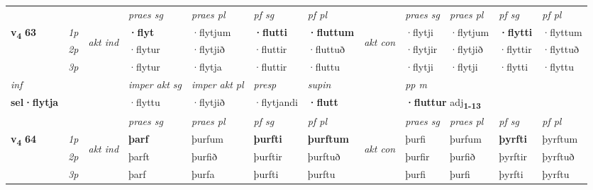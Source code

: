 \begin{longtable}[l]{X>{\footnotesize\itshape}llXXXXlXXXX}
 & &   & \textit{praes sg}  & \textit{praes pl}    & \textit{ pf sg} & \textit{pf pl} & & \textit{praes sg}  & \textit{praes pl}    & \textit{pf sg} & \textit{pf pl }  \\ \cmidrule{4-7} \cmidrule{9-12}
 \multirow{2}{*}{{{\textbf{v{\textsubscript{4}}} \Large{\textbf{63}}}}}  & 1p & \multirow{3}{*}{\begin{turn}{90}\textit{akt ind}\end{turn}} & \textbf{·flyt} & ·flytjum & \textbf{·flutti} & \textbf{·fluttum} & \multirow{3}{*}{\begin{turn}{90}\textit{akt con}\end{turn}} &·flytji & ·flytjum & \textbf{·flytti} & ·flyttum\\*
 & 2p &  &  ·flytur  & ·flytjið & ·fluttir & ·fluttuð & & ·flytjir & ·flytjið & ·flyttir & ·flyttuð \\*
 & 3p &  & ·flytur & ·flytja & ·fluttir & ·fluttu & & ·flytji & ·flytji& ·flytti & ·flyttu \\*
\cmidrule{4-7} \cmidrule{9-12}

   {\textit{inf}} & &  & \textit{imper akt sg} & \textit{imper akt pl}   & \textit{presp} & \textit{supin}  && \textit{pp m} \\*
  {\textbf{sel\allowbreak ·flytja}} & && ·flyttu  & ·flytjið   & ·flytjandi &  \textbf{·flutt}  && \multicolumn{2}{l}{\textbf{·fluttur} adj\textbf{\textsubscript{1-13}}} \\*

\midrule

 & &   & \textit{praes sg}  & \textit{praes pl}    & \textit{ pf sg} & \textit{pf pl} & & \textit{praes sg}  & \textit{praes pl}    & \textit{pf sg} & \textit{pf pl }  \\ \cmidrule{4-7} \cmidrule{9-12}
 \multirow{2}{*}{{{\textbf{v{\textsubscript{4}}} \Large{\textbf{64}}}}}  & 1p & \multirow{3}{*}{\begin{turn}{90}\textit{akt ind}\end{turn}} & \textbf{þarf} & þurfum & \textbf{þurfti} & \textbf{þurftum} & \multirow{3}{*}{\begin{turn}{90}\textit{akt con}\end{turn}} &þurfi & þurfum & \textbf{þyrfti} & þyrftum\\*
 & 2p &  &  þarft  & þurfið & þurftir & þurftuð & & þurfir & þurfið & þyrftir & þyrftuð \\*
 & 3p &  & þarf & þurfa & þurfti & þurftu & & þurfi & þurfi& þyrfti & þyrftu \\*
\cmidrule{4-7} \cmidrule{9-12}


\end{longtable}
